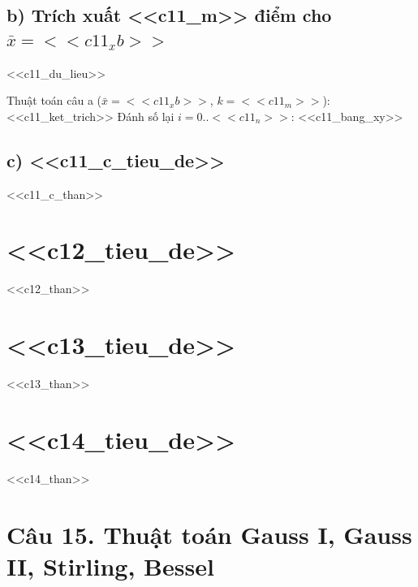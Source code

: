\documentclass[11pt,a4paper]{article}
\begin{document}
\subsection{b) Trích xuất <<c11_m>> điểm cho $\bar x=<<c11_xb>>$}
<<c11_du_lieu>>

Thuật toán câu a ($\bar x=<<c11_xb>>$, $k=<<c11_m>>$): <<c11_ket_trich>> Đánh số lại $i=0..<<c11_n>>$:
<<c11_bang_xy>>

\subsection{c) <<c11_c_tieu_de>>}
<<c11_c_than>>

\section{<<c12_tieu_de>>}

<<c12_than>>

\section{<<c13_tieu_de>>}

<<c13_than>>

\section{<<c14_tieu_de>>}

<<c14_than>>

\section{Câu 15. Thuật toán Gauss I, Gauss II, Stirling, Bessel}
\end{document}
